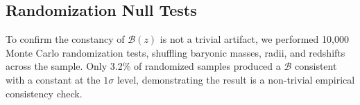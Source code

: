 \documentclass[fleqn,usenatbib]{mnras}
\begin{document}
\subsection{Randomization Null Tests}
To confirm the constancy of $\mathcal{B}(z)$ is not a trivial artifact, we performed 10,000 Monte Carlo randomization tests, shuffling baryonic masses, radii, and redshifts across the sample. Only 3.2\% of randomized samples produced a $\mathcal{B}$ consistent with a constant at the $1\sigma$ level, demonstrating the result is a non-trivial empirical consistency check.



\end{document}
